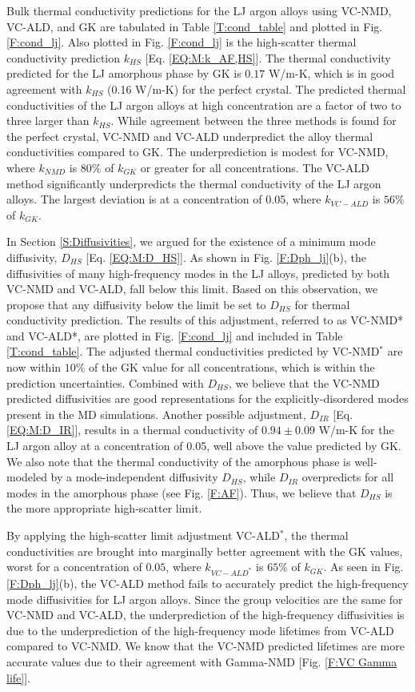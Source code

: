 \documentclass[aps,prb,onecolumn,preprint,footinbib,superscriptaddress,amsmath,amssymb,floatfix]{revtex4}
\begin{document}
Bulk thermal conductivity predictions for the LJ argon alloys using  
VC-NMD, VC-ALD, and GK are tabulated in Table \ref{T:cond_table} 
and plotted in Fig. \ref{F:cond_lj}. Also plotted 
in Fig. \ref{F:cond_lj} is the high-scatter   
thermal conductivity prediction $k_{HS}$ 
[Eq. \eqref{EQ:M:k_AF,HS}]. The thermal conductivity predicted 
for the LJ amorphous phase by GK is $0.17$ W/m-K,  
which is in good agreement with $k_{HS}$ (0.16 W/m-K) for the 
perfect crystal.  
The predicted thermal conductivities of the LJ argon alloys at high 
concentration are a factor of two to three larger than $k_{HS}$.  
While agreement between the three methods is found for the perfect 
crystal, VC-NMD and VC-ALD underpredict the alloy thermal 
conductivities compared to GK. 
The underprediction is modest for VC-NMD, where $k_{NMD}$ is 
$80\%$ of $k_{GK}$ or greater for all concentrations. The VC-ALD method 
significantly underpredicts the thermal conductivity of the LJ argon alloys. 
The largest deviation is at a concentration of 0.05, where 
$k_{VC-ALD}$ is $56\%$ of $k_{GK}$.

In Section \ref{S:Diffusivities}, 
we argued for the existence of a minimum mode 
diffusivity, $D_{HS}$ [Eq. \eqref{EQ:M:D_HS}]. 
As shown in Fig. \ref{F:Dph_lj}(b), the diffusivities of 
many high-frequency modes in the LJ alloys, predicted by both VC-NMD 
and VC-ALD, fall below this limit.  Based on this observation, we propose 
that any diffusivity below the limit be set to $D_{HS}$ 
for thermal conductivity prediction. 
The results of this adjustment, 
referred to as VC-NMD* and VC-ALD*, are plotted in Fig. \ref{F:cond_lj} 
and included in Table \ref{T:cond_table}.  
The adjusted thermal conductivities predicted by VC-NMD$^*$ are now  
within $10\%$ of the GK value for all concentrations, which
is within the prediction uncertainties. 
Combined with $D_{HS}$, we believe that the VC-NMD predicted 
diffusivities are good representations for the explicitly-disordered 
modes present in the MD simulations. Another possible 
adjustment, $D_{IR}$ [Eq. \eqref{EQ:M:D_IR}], results in a thermal 
conductivity of $0.94 \pm 0.09$ W/m-K for the LJ argon alloy at a 
concentration of 0.05, well above the value predicted by GK. 
We also note that the thermal 
conductivity of the amorphous phase is well-modeled by a mode-independent 
diffusivity $D_{HS}$, while $D_{IR}$ overpredicts for all modes in the 
amorphous phase (see Fig. \ref{F:AF}). 
Thus, we believe that $D_{HS}$ is the more appropriate high-scatter limit. 

By applying the high-scatter limit adjustment VC-ALD$^*$, the thermal 
conductivities are brought into marginally better agreement with 
the GK values, worst for a concentration of $0.05$, where 
$k_{VC-ALD^*}$ is $65\%$ of $ k_{GK}$.  
As seen in Fig. \ref{F:Dph_lj}(b), the VC-ALD method fails to 
accurately predict the high-frequency mode diffusivities for 
LJ argon alloys. Since the group velocities are the same for 
VC-NMD and VC-ALD, the underprediction of the high-frequency 
diffusivities is
due to the underprediction of the high-frequency 
mode lifetimes from VC-ALD compared to VC-NMD. We know that the 
VC-NMD predicted lifetimes are more accurate values due 
to their agreement with Gamma-NMD [Fig. \ref{F:VC Gamma life}]. 
\end{document}
